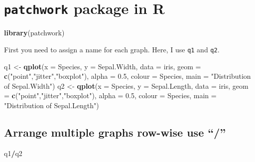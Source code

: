 \documentclass[]{article}
\newenvironment{Shaded}{\begin{snugshade}}{\end{snugshade}}
\newcommand{\DataTypeTok}[1]{\textcolor[rgb]{0.13,0.29,0.53}{#1}}
\newcommand{\FloatTok}[1]{\textcolor[rgb]{0.00,0.00,0.81}{#1}}
\newcommand{\KeywordTok}[1]{\textcolor[rgb]{0.13,0.29,0.53}{\textbf{#1}}}
\newcommand{\NormalTok}[1]{#1}
\newcommand{\OperatorTok}[1]{\textcolor[rgb]{0.81,0.36,0.00}{\textbf{#1}}}
\newcommand{\StringTok}[1]{\textcolor[rgb]{0.31,0.60,0.02}{#1}}
\begin{document}
\newpage

\hypertarget{patchwork-package-in-r}{%
\section{\texorpdfstring{\texttt{patchwork} package in
R}{patchwork package in R}}\label{patchwork-package-in-r}}

\begin{Shaded}
\begin{Highlighting}[]
\KeywordTok{library}\NormalTok{(patchwork) }
\end{Highlighting}
\end{Shaded}

First you need to assign a name for each graph. Here, I use \texttt{q1}
and \texttt{q2}.

\begin{Shaded}
\begin{Highlighting}[]
\NormalTok{q1 <-}\StringTok{ }\KeywordTok{qplot}\NormalTok{(}\DataTypeTok{x =}\NormalTok{ Species, }\DataTypeTok{y =}\NormalTok{ Sepal.Width, }\DataTypeTok{data =}\NormalTok{ iris, }\DataTypeTok{geom =} \KeywordTok{c}\NormalTok{(}\StringTok{"point"}\NormalTok{,}\StringTok{"jitter"}\NormalTok{,}\StringTok{"boxplot"}\NormalTok{), }
      \DataTypeTok{alpha =} \FloatTok{0.5}\NormalTok{, }\DataTypeTok{colour =}\NormalTok{ Species, }\DataTypeTok{main =} \StringTok{"Distribution of Sepal.Width"}\NormalTok{)}
\NormalTok{q2 <-}\StringTok{ }\KeywordTok{qplot}\NormalTok{(}\DataTypeTok{x =}\NormalTok{ Species, }\DataTypeTok{y =}\NormalTok{ Sepal.Length, }\DataTypeTok{data =}\NormalTok{ iris, }\DataTypeTok{geom =} \KeywordTok{c}\NormalTok{(}\StringTok{"point"}\NormalTok{,}\StringTok{"jitter"}\NormalTok{,}\StringTok{"boxplot"}\NormalTok{), }
      \DataTypeTok{alpha =} \FloatTok{0.5}\NormalTok{, }\DataTypeTok{colour =}\NormalTok{ Species, }\DataTypeTok{main =} \StringTok{"Distribution of Sepal.Length"}\NormalTok{)}
\end{Highlighting}
\end{Shaded}

\hypertarget{arrange-multiple-graphs-row-wise-use}{%
\subsection{Arrange multiple graphs row-wise use
``/''}\label{arrange-multiple-graphs-row-wise-use}}

\begin{Shaded}
\begin{Highlighting}[]
\NormalTok{q1}\OperatorTok{/}\NormalTok{q2}
\end{Highlighting}
\end{Shaded}
\end{document}
